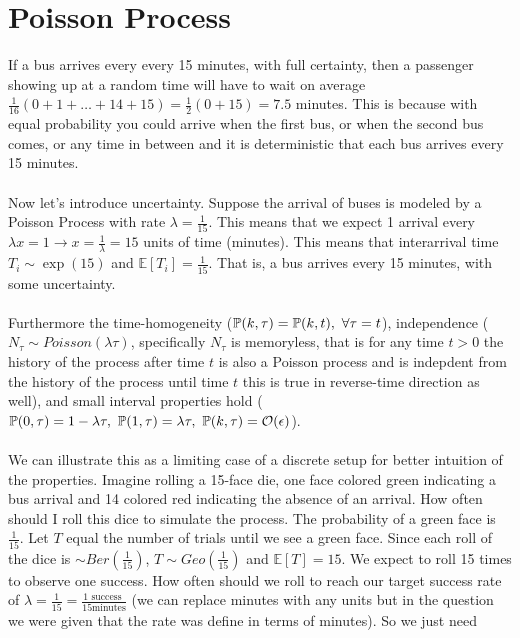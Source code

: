 \documentclass[11pt]{scrartcl}
\begin{document}
\section{Poisson Process}
If a bus arrives every every 15 minutes, with full certainty, then a passenger
showing up at a random time will have to wait on average $\frac{1}{16}(0
+1+\ldots + 14 + 15) = \frac{1}{2}(0 + 15) = 7.5$ minutes. This is because
with equal probability you could arrive when the first bus, or when the second
bus comes, or any time in between and it is deterministic that each bus arrives
every 15 minutes.\\\\ Now let's introduce uncertainty. Suppose the arrival of
buses is modeled by a Poisson Process with rate $\lambda=\frac{1}{15}$. This
means that we expect 1 arrival every $\lambda x = 1 \to x = \frac{1}{\lambda
} = 15$ units of time (minutes). This means that interarrival
time $T_{i} \sim \exp(15)$ and $\mathbb{E}[T_{i}]=\frac{1}{15}$. That is, a bus arrives
every 15 minutes, with some uncertainty. \\\\ Furthermore the time-homogeneity
($\mathbb{P}(k, \tau) = \mathbb{P}(k, t), ~\forall \tau=t$),
independence ($N_{\tau}\sim Poisson(\lambda \tau)$, specifically $N_{\tau}$ is
memoryless, that is for any time $t>0$ the history of the process after time $t$ is
also a Poisson process and is indepdent from the history of the process until
time $t$ this is true in reverse-time direction as well), and small interval
properties hold ($\mathbb{P}(0, \tau) = 1-\lambda \tau, ~ \mathbb{P}(1, \tau) = \lambda \tau,
~ \mathbb{P}(k, \tau) = \mathcal{O}(\epsilon)$). \\\\ We can illustrate this as
a limiting case of a discrete setup for better intuition of the properties.
Imagine rolling a 15-face die, one face colored green indicating a bus arrival and
14 colored red indicating the absence of an arrival. How often should I roll
   this dice to simulate the process. The probability of a green face
   is $\frac{1}{15}$. Let $T$ equal the number of trials until we see a green
   face. Since each roll of the dice is $\sim Ber(\frac{1}{15})$,
   $T\sim Geo(\frac{1}{15})$ and $\mathbb{E}[T]=15$. We expect to roll 15
   times to observe one success. How often should we roll to reach our target
   success rate of $\lambda = \frac{1}{15} = \frac{1\text{ success }}{15\text{
   minutes}}$ (we can replace minutes with any units but in the question we
   were given that the rate was define in terms of minutes).  So we just need
\end{document}
